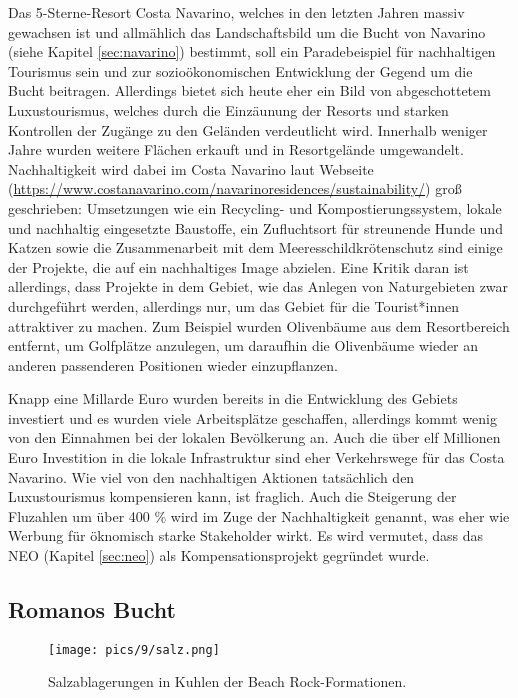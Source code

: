 \documentclass[preprint]{geomorphica} %
\begin{document}
Das 5-Sterne-Resort Costa Navarino, welches in den letzten Jahren massiv gewachsen ist und allmählich das Landschaftsbild um die Bucht von Navarino (siehe Kapitel \ref{sec:navarino}) bestimmt, soll ein Paradebeispiel für nachhaltigen Tourismus sein und zur sozioökonomischen Entwicklung der Gegend um die Bucht beitragen. Allerdings bietet sich heute eher ein Bild von abgeschottetem Luxustourismus, welches durch die Einzäunung der Resorts und starken Kontrollen der Zugänge zu den Geländen verdeutlicht wird. Innerhalb weniger Jahre wurden weitere Flächen erkauft und in Resortgelände umgewandelt. Nachhaltigkeit wird dabei im Costa Navarino laut Webseite (\url{https://www.costanavarino.com/navarinoresidences/sustainability/}) groß geschrieben: Umsetzungen wie ein Recycling- und Kompostierungssystem, lokale und nachhaltig eingesetzte Baustoffe, ein Zufluchtsort für streunende Hunde und Katzen sowie die Zusammenarbeit mit dem Meeresschildkrötenschutz sind einige der Projekte, die auf ein nachhaltiges Image abzielen. Eine Kritik daran ist allerdings, dass Projekte in dem Gebiet, wie das Anlegen von Naturgebieten zwar durchgeführt werden, allerdings nur, um das Gebiet für die Tourist*innen attraktiver zu machen. Zum Beispiel wurden Olivenbäume aus dem Resortbereich entfernt, um Golfplätze anzulegen, um daraufhin die Olivenbäume wieder an anderen passenderen Positionen wieder einzupflanzen.

Knapp eine Millarde Euro wurden bereits in die Entwicklung des Gebiets investiert und es wurden viele Arbeitsplätze geschaffen, allerdings kommt wenig von den Einnahmen bei der lokalen Bevölkerung an. Auch die über elf Millionen Euro Investition in die lokale Infrastruktur sind eher Verkehrswege für das Costa Navarino. Wie viel von den nachhaltigen Aktionen tatsächlich den Luxustourismus kompensieren kann, ist fraglich. Auch die Steigerung der Fluzahlen um über 400 \% wird im Zuge der Nachhaltigkeit genannt, was eher wie Werbung für öknomisch starke Stakeholder wirkt. Es wird vermutet, dass das NEO (Kapitel \ref{sec:neo}) als Kompensationsprojekt gegründet wurde.

\subsection{Romanos Bucht}

\begin{wrapfigure}{r}{0.3\textwidth}
    \centering
    \texttt{[image: pics/9/salz.png]}
    \caption{Salzablagerungen in Kuhlen der Beach Rock-Formationen.}
    \label{pic:salz}
\end{wrapfigure}
\end{document}
